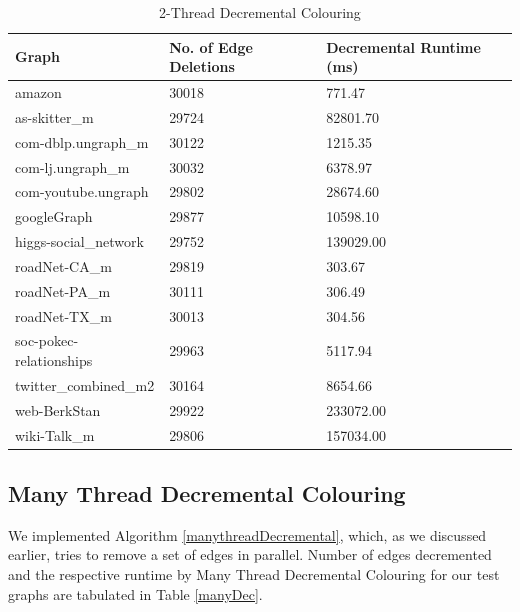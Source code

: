 \documentclass[MTech]{iitmdiss}
\begin{document}
\begin{table}[]
\centering
\begin{tabular}{|l|l|l|}
\hline
Graph                   & No. of Edge Deletions & Decremental Runtime (ms) \\ \hline
amazon                  & 30018                 & 771.47                   \\ \hline
as-skitter\_m           & 29724                 & 82801.70                 \\ \hline
com-dblp.ungraph\_m     & 30122                 & 1215.35                  \\ \hline
com-lj.ungraph\_m       & 30032                 & 6378.97                  \\ \hline
com-youtube.ungraph     & 29802                 & 28674.60                 \\ \hline
googleGraph             & 29877                 & 10598.10                 \\ \hline
higgs-social\_network   & 29752                 & 139029.00                \\ \hline
roadNet-CA\_m           & 29819                 & 303.67                   \\ \hline
roadNet-PA\_m           & 30111                 & 306.49                   \\ \hline
roadNet-TX\_m           & 30013                 & 304.56                   \\ \hline
soc-pokec-relationships & 29963                 & 5117.94                  \\ \hline
twitter\_combined\_m2   & 30164                 & 8654.66                  \\ \hline
web-BerkStan            & 29922                 & 233072.00                \\ \hline
wiki-Talk\_m            & 29806                 & 157034.00                \\ \hline
\end{tabular}
\caption{2-Thread Decremental Colouring}
\label{twoDec}
\end{table}

\subsection{Many Thread Decremental Colouring}
We implemented Algorithm \ref{manythreadDecremental}, which, as we discussed earlier, tries to remove a set of edges in parallel. Number of edges decremented and the respective runtime by Many Thread Decremental Colouring for our test graphs are tabulated in Table \ref{manyDec}.
\end{document}
